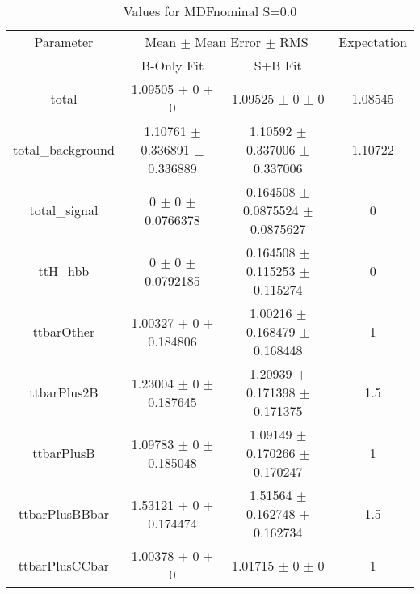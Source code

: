 \begin{table}
\centering
\caption{Values for MDFnominal S=0.0}
\begin{tabular}{cccc}
\toprule
Parameter & \multicolumn{2}{c}{Mean $\pm$ Mean Error $\pm$ RMS} & Expectation\\
 & B-Only Fit & S+B Fit & \\
\midrule
total & \num{1.09505} $\pm$ \num{0} $\pm$ \num{0} & \num{1.09525} $\pm$ \num{0} $\pm$ \num{0} & \num{1.08545}\\
total\_background & \num{1.10761} $\pm$ \num{0.336891} $\pm$ \num{0.336889} & \num{1.10592} $\pm$ \num{0.337006} $\pm$ \num{0.337006} & \num{1.10722}\\
total\_signal & \num{0} $\pm$ \num{0} $\pm$ \num{0.0766378} & \num{0.164508} $\pm$ \num{0.0875524} $\pm$ \num{0.0875627} & \num{0}\\
ttH\_hbb & \num{0} $\pm$ \num{0} $\pm$ \num{0.0792185} & \num{0.164508} $\pm$ \num{0.115253} $\pm$ \num{0.115274} & \num{0}\\
ttbarOther & \num{1.00327} $\pm$ \num{0} $\pm$ \num{0.184806} & \num{1.00216} $\pm$ \num{0.168479} $\pm$ \num{0.168448} & \num{1}\\
ttbarPlus2B & \num{1.23004} $\pm$ \num{0} $\pm$ \num{0.187645} & \num{1.20939} $\pm$ \num{0.171398} $\pm$ \num{0.171375} & \num{1.5}\\
ttbarPlusB & \num{1.09783} $\pm$ \num{0} $\pm$ \num{0.185048} & \num{1.09149} $\pm$ \num{0.170266} $\pm$ \num{0.170247} & \num{1}\\
ttbarPlusBBbar & \num{1.53121} $\pm$ \num{0} $\pm$ \num{0.174474} & \num{1.51564} $\pm$ \num{0.162748} $\pm$ \num{0.162734} & \num{1.5}\\
ttbarPlusCCbar & \num{1.00378} $\pm$ \num{0} $\pm$ \num{0} & \num{1.01715} $\pm$ \num{0} $\pm$ \num{0} & \num{1}\\
\bottomrule
\end{tabular}
\end{table}